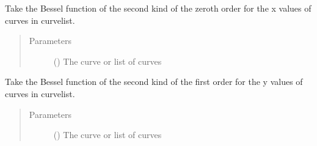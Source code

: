 \documentclass[letterpaper,10pt,english]{sphinxmanual}
\begin{document}

\begin{fulllineitems}
\label{\detokenize{pydv:pydvpy.y0x}}
Take the Bessel function of the second kind of the zeroth order for the x values of
curves in curvelist.
\begin{quote}\begin{description}
\item[{Parameters}] \leavevmode
{} () \textendash{} The curve or list of curves

\end{description}\end{quote}

\end{fulllineitems}


\begin{fulllineitems}
\label{\detokenize{pydv:pydvpy.y1}}
Take the Bessel function of the second kind of the first order for the y values of
curves in curvelist.
\begin{quote}\begin{description}
\item[{Parameters}] \leavevmode
{} () \textendash{} The curve or list of curves

\end{description}\end{quote}

\end{fulllineitems}

\end{document}
